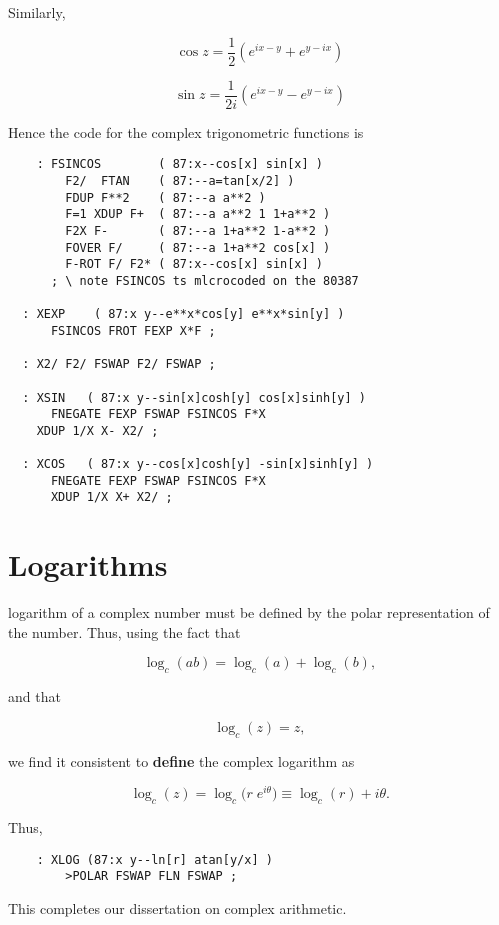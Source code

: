 Similarly,

\begin{equation}
  \cos z = \frac{1}{2 }\left(e^{ix-y} + e^{y - ix}\right)
\end{equation}

\begin{equation}
  \sin z = \frac{1}{2i}\left(e^{ix-y} - e^{y - ix}\right)
\end{equation}

Hence the code for the complex trigonometric functions is

\begin{lstlisting}
    : FSINCOS        ( 87:x--cos[x] sin[x] )
        F2/  FTAN    ( 87:--a=tan[x/2] )
        FDUP F**2    ( 87:--a a**2 )
        F=1 XDUP F+  ( 87:--a a**2 1 1+a**2 )
        F2X F-       ( 87:--a 1+a**2 1-a**2 )
        FOVER F/     ( 87:--a 1+a**2 cos[x] )
        F-ROT F/ F2* ( 87:x--cos[x] sin[x] )
      ; \ note FSINCOS ts mlcrocoded on the 80387

  : XEXP    ( 87:x y--e**x*cos[y] e**x*sin[y] )
      FSINCOS FROT FEXP X*F ;

  : X2/ F2/ FSWAP F2/ FSWAP ;

  : XSIN   ( 87:x y--sin[x]cosh[y] cos[x]sinh[y] )
      FNEGATE FEXP FSWAP FSINCOS F*X
    XDUP 1/X X- X2/ ;

  : XCOS   ( 87:x y--cos[x]cosh[y] -sin[x]sinh[y] )
      FNEGATE FEXP FSWAP FSINCOS F*X
      XDUP 1/X X+ X2/ ;
\end{lstlisting}

\section{Logarithms}
 logarithm of a complex number must be defined by the polar representation of the number. Thus, using the fact that

\begin{equation}
  \log_c(ab) = \log_c(a) + \log_c(b) ,
\end{equation}

and that

\begin{equation}
  \log_c(z) = z ,
\end{equation}

we find it consistent to \textbf{define} the complex logarithm as

\begin{equation}
  \log_c(z) = \log_c\big(r\;e^{i\theta}\big) \equiv \log_c(r) + i\theta.
\end{equation}

Thus,

\begin{lstlisting}
    : XLOG (87:x y--ln[r] atan[y/x] )
        >POLAR FSWAP FLN FSWAP ;
\end{lstlisting}

This completes our dissertation on complex arithmetic.